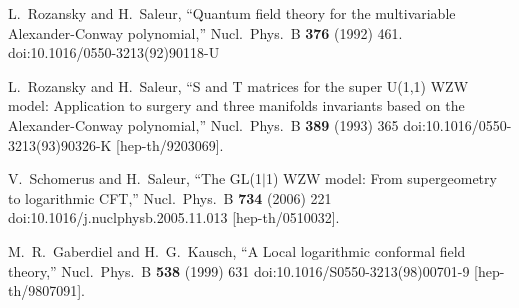 \documentclass[12pt]{article}
\numberwithin{equation}{section}
\numberwithin{equation}{section}
\numberwithin{table}{section}\setlength{\multlinegap}{25pt}
\begin{document}





















\begin{thebibliography}{99}
  L.~Rozansky and H.~Saleur,
  ``Quantum field theory for the multivariable Alexander-Conway polynomial,''
  Nucl.\ Phys.\ B {\bf 376} (1992) 461.
  doi:10.1016/0550-3213(92)90118-U

  L.~Rozansky and H.~Saleur,
 ``S and T matrices for the super U(1,1) WZW model: Application to surgery and three manifolds invariants based on the Alexander-Conway polynomial,''
  Nucl.\ Phys.\ B {\bf 389} (1993) 365
  doi:10.1016/0550-3213(93)90326-K
  [hep-th/9203069].



  V.~Schomerus and H.~Saleur,
  ``The GL(1$|$1) WZW model: From supergeometry to logarithmic CFT,''
  Nucl.\ Phys.\ B {\bf 734} (2006) 221
  doi:10.1016/j.nuclphysb.2005.11.013
  [hep-th/0510032].

  M.~R.~Gaberdiel and H.~G.~Kausch,
  ``A Local logarithmic conformal field theory,''
  Nucl.\ Phys.\ B {\bf 538} (1999) 631
  doi:10.1016/S0550-3213(98)00701-9
  [hep-th/9807091].


\end{thebibliography}
\end{document}
